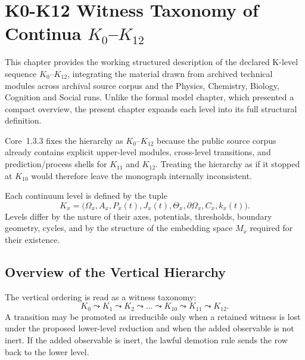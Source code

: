
\section{K0-K12 Witness Taxonomy of Continua \texorpdfstring{\texorpdfstring{$K_0$}{K\_0}–$K_{12}$}{K0–K12}}
\label{sec:klevels-full}

This chapter provides the working structured description of the declared K-level sequence \(K_0\)–\(K_{12}\), integrating the material drawn from archived technical modules across archival source corpus and the Physics, Chemistry, Biology, Cognition
and Social runs.
Unlike the formal model chapter, which presented a compact overview, the
present chapter expands each level into its full structural definition.

Core~1.3.3 fixes the hierarchy as \(K_0\)–\(K_{12}\) because the public source
corpus already contains explicit upper-level modules, cross-level transitions,
and prediction/process shells for \(K_{11}\) and \(K_{12}\).
Treating the hierarchy as if it stopped at \(K_{10}\) would therefore leave the
monograph internally inconsistent.

Each continuum level is defined by the tuple
\[
    K_x = \big(\Omega_x, A_x, P_x(t), J_x(t), \Theta_x,
           \partial\Omega_x, C_x, k_x(t)\big).
\]
Levels differ by the nature of their axes, potentials, thresholds,
boundary geometry, cycles, and by the structure of the embedding space
\(M_x\) required for their existence.


\subsection{Overview of the Vertical Hierarchy}

The vertical ordering is read as a witness taxonomy:
\[
    K_0 \leadsto K_1 \leadsto K_2 \leadsto \dots
    \leadsto K_{10} \leadsto K_{11} \leadsto K_{12}.
\]
A transition may be promoted as irreducible only when a retained witness is lost under the proposed lower-level reduction and when the added observable is not inert. If the added observable is inert, the lawful demotion rule sends the row back to the lower level.

